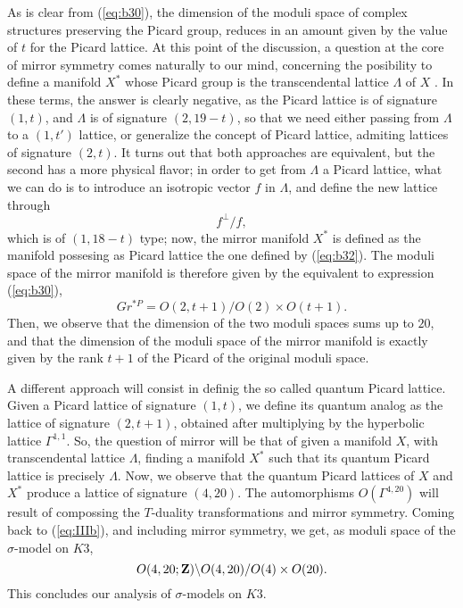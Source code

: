 As is clear from (\ref{eq:b30}), the dimension of the moduli
space of complex structures preserving the Picard group, reduces
in an amount given by the value of $t$ for the Picard lattice. At
this point of the discussion, a question at the core of mirror
symmetry comes naturally to our mind, concerning the posibility
to define a manifold $X^*$ whose Picard group is the
transcendental lattice $\Lambda$ of $X$ \cite{Dolgachev}. In these terms, the
answer is clearly negative, as the Picard lattice is of signature
$(1,t)$, and $\Lambda$ is of signature $(2,19-t)$, so that we need
either passing from $\Lambda$ to a $(1,t')$ lattice, or generalize the concept of Picard
lattice, admiting lattices of signature $(2,t)$. It turns out
that both approaches are equivalent, but the second has a more
physical flavor; in order to get from $\Lambda$ a Picard lattice, 
what we can do is to introduce an isotropic vector $f$ in $\Lambda$,
and define the new lattice through
\begin{equation}
f^{\perp}/f,
\label{eq:b32}
\end{equation}
which is of $(1,18-t)$ type; now, the mirror manifold $X^*$ is
defined as the manifold possesing as Picard lattice the one
defined by (\ref{eq:b32}). The moduli space of the mirror
manifold is therefore given by the equivalent to expression
(\ref{eq:b30}),
\begin{equation}
Gr^{*P} = O(2,t+1)/O(2) \times O(t+1).
\label{eq:b33}
\end{equation}
Then, we observe that the dimension of the two moduli spaces sums
up to $20$, and that the dimension of the moduli space of the
mirror manifold is exactly given by the rank $t+1$ of the
Picard of the original moduli space.
  
A different approach will consist in definig the so called
quantum Picard lattice. Given a Picard lattice of signature
$(1,t)$, we define its quantum analog as the lattice of signature
$(2,t+1)$, obtained after multiplying by the hyperbolic lattice
$\Gamma^{1,1}$. So, the question of mirror will be that of given
a manifold $X$, with transcendental lattice $\Lambda$, finding a
manifold $X^*$ such that its quantum Picard lattice is precisely
$\Lambda$. Now, we observe that the quantum Picard lattices of
$X$ and $X^*$ produce a lattice of signature $(4,20)$. The
automorphisms $O(\Gamma^{4,20})$ will result of compossing the
$T$-duality transformations and mirror symmetry. Coming back to
(\ref{eq:IIIb}), and including mirror symmetry, we get, as
moduli space of the $\sigma$-model on $K3$,
\begin{equation}
O(4,20;{\bf Z}) \backslash O(4,20) / O(4) \times O(20).
\end{equation}
This concludes our analysis of $\sigma$-models on $K3$.


